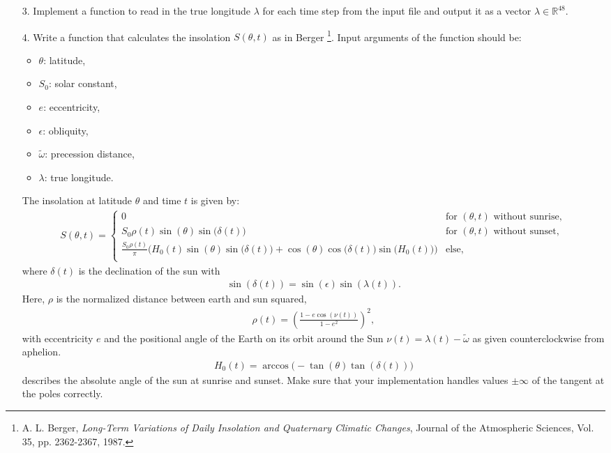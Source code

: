 \documentclass[10pt]{scrartcl}
\newcommand{\lat}{\theta}
\begin{document}
\begin{enumerate}
\item[3.] Implement a function \small\texttt{} \normalsize to read in the true longitude $\lambda$ for each time step from the input file \small\texttt{} \normalsize and output it as a vector $\lambda \in \mathbb{R}^{48}$.

\item[4.] Write a function \small\texttt{}  \normalsize that calculates the insolation $S\left(\lat,t\right)$ as in Berger \footnote{A. L. Berger, {\em Long-Term Variations of Daily Insolation and Quaternary Climatic Changes}, Journal of the Atmospheric Sciences, Vol. 35, pp. 2362-2367, 1987.}. Input arguments of the function should be:
\begin{itemize}
\item $\theta$: latitude,
\item $S_0$: solar constant,
\item $e$: eccentricity,
\item $\epsilon$: obliquity,
\item $\tilde \omega$: precession distance,
\item $\lambda$: true longitude.
\end{itemize}

The insolation at latitude $\lat$ and time $t$ is given by:
\begin{align*}
S(\lat,t) =
\begin{cases}
0 & \text{for $(\lat,t)$ without sunrise}, \\
S_0\rho(t) \sin (\lat) \sin \big(\delta(t)\big) & \text{for $(\lat,t)$ without sunset}, \\
\frac{S_0 \rho(t)}{\pi}\Big(H_0(t) \sin (\lat) \sin \big(\delta(t)\big) + \cos (\lat) \cos \big(\delta(t)\big) \sin \big(H_0(t)\big)\Big) & \text{else}, \\
\end{cases}
\end{align*}
where $\delta(t)$ is the declination of the sun with
\begin{align*}
\sin(\delta(t)) = \sin(\epsilon)\sin (\lambda(t)).
\end{align*}
Here, $\rho$ is the normalized distance between earth and sun squared,
 \begin{align*}
 \rho(t) =  \left(\frac{1 - e \cos (\nu(t))}{1-e^2}\right)^2,
 \end{align*}
with eccentricity $e$ and the positional angle of the Earth on its orbit around the Sun $\nu(t)=\lambda(t)-\tilde \omega$ as given counterclockwise from aphelion.
\begin{align*}
H_0(t)= \arccos\big(-\tan(\lat) \tan(\delta(t))\big)
\end{align*}
describes the absolute angle of the sun at sunrise and sunset.
Make sure that your implementation handles values $\pm \infty$ of the tangent at the poles correctly.


\end{enumerate}
\end{document}

